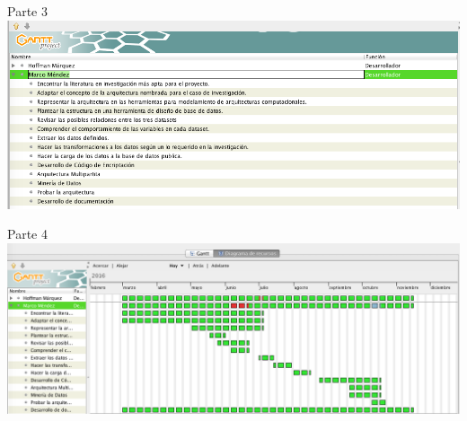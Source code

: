 \documentclass[a4paper, 12pt, oneside]{article}
\theoremstyle{definition}
\theoremstyle{remark}
\begin{document}
\begin{table}
\begin{center}
Parte 3
\includegraphics[width=\textwidth]{Marco1.png}
\end{center}
\end{table}
\clearpage

\begin{table}
\begin{center}
Parte 4
\includegraphics[width=\textwidth]{Marco2.png}
\end{center}
\end{table}
\clearpage

\clearpage



\end{document}
